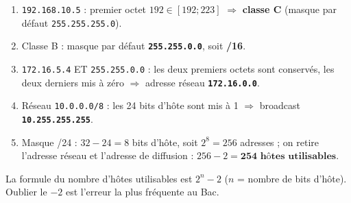 \documentclass[11pt]{article}
\begin{document}
\begin{corrige}

\begin{enumerate}
    \item \texttt{192.168.10.5} : premier octet $192 \in [192 ; 223]$ $\Rightarrow$ \textbf{classe C} (masque par défaut \texttt{255.255.255.0}).
    \item Classe B : masque par défaut \textbf{\texttt{255.255.0.0}}, soit \textbf{/16}.
    \item \texttt{172.16.5.4} ET \texttt{255.255.0.0} : les deux premiers octets sont conservés, les deux derniers mis à zéro $\Rightarrow$ adresse réseau \textbf{\texttt{172.16.0.0}}.
    \item Réseau \texttt{10.0.0.0/8} : les 24 bits d'hôte sont mis à 1 $\Rightarrow$ broadcast \textbf{\texttt{10.255.255.255}}.
    \item Masque /24 : $32 - 24 = 8$ bits d'hôte, soit $2^8 = 256$ adresses ; on retire l'adresse réseau et l'adresse de diffusion : $256 - 2 = \textbf{254 hôtes utilisables}$.
\end{enumerate}

\begin{attention}
La formule du nombre d'hôtes utilisables est $2^n - 2$ ($n$ = nombre de bits d'hôte). Oublier le $-2$ est l'erreur la plus fréquente au Bac.
\end{attention}
\end{corrige}
\end{document}
